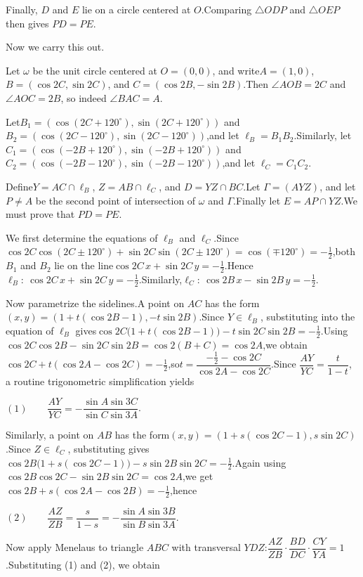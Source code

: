 \begin{enumerate}
 Finally, $D$ and $E$ lie on a circle centered at $O$.Comparing $\triangle ODP$ and $\triangle OEP$ then gives $PD=PE$.

 Now we carry this out.

 Let $\omega$ be the unit circle centered at $O=(0,0)$, and write$A=(1,0)$, $B=(\cos 2C,\sin 2C)$, and $C=(\cos 2B,-\sin 2B)$.Then $\angle AOB=2C$ and $\angle AOC=2B$, so indeed $\angle BAC=A$.

 Let$B_1=(\cos(2C+120^\circ),\sin(2C+120^\circ))$ and$B_2=(\cos(2C-120^\circ),\sin(2C-120^\circ))$,and let $\ell_B=B_1B_2$.Similarly, let$C_1=(\cos(-2B+120^\circ),\sin(-2B+120^\circ))$ and$C_2=(\cos(-2B-120^\circ),\sin(-2B-120^\circ))$,and let $\ell_C=C_1C_2$.

 Define$Y=AC\cap \ell_B$, $Z=AB\cap \ell_C$, and $D=YZ\cap BC$.Let $\Gamma=(AYZ)$, and let $P\ne A$ be the second point of intersection of $\omega$ and $\Gamma$.Finally let $E=AP\cap YZ$.We must prove that $PD=PE$.

 We first determine the equations of $\ell_B$ and $\ell_C$.Since$\cos 2C\cos(2C\pm120^\circ)+\sin 2C\sin(2C\pm120^\circ)=\cos(\mp120^\circ)=-\frac12$,both $B_1$ and $B_2$ lie on the line$\cos 2C\,x+\sin 2C\,y=-\frac12$.Hence$\ell_B:\ \cos 2C\,x+\sin 2C\,y=-\frac12$.Similarly,$\ell_C:\ \cos 2B\,x-\sin 2B\,y=-\frac12$.

 Now parametrize the sidelines.A point on $AC$ has the form$(x,y)=(1+t(\cos 2B-1),-t\sin 2B)$.Since $Y\in \ell_B$, substituting into the equation of $\ell_B$ gives$\cos 2C\bigl(1+t(\cos 2B-1)\bigr)-t\sin 2C\sin 2B=-\frac12$.Using$\cos 2C\cos 2B-\sin 2C\sin 2B=\cos 2(B+C)=\cos 2A$,we obtain$\cos 2C+t(\cos 2A-\cos 2C)=-\frac12$,so$t=\dfrac{-\frac12-\cos 2C}{\cos 2A-\cos 2C}$.Since $\dfrac{AY}{YC}=\dfrac{t}{1-t}$, a routine trigonometric simplification yields

 $(1)\qquad \dfrac{AY}{YC}=-\dfrac{\sin A\sin 3C}{\sin C\sin 3A}$.

 Similarly, a point on $AB$ has the form$(x,y)=(1+s(\cos 2C-1),s\sin 2C)$.Since $Z\in \ell_C$, substituting gives$\cos 2B\bigl(1+s(\cos 2C-1)\bigr)-s\sin 2B\sin 2C=-\frac12$.Again using$\cos 2B\cos 2C-\sin 2B\sin 2C=\cos 2A$,we get$\cos 2B+s(\cos 2A-\cos 2B)=-\frac12$,hence

 $(2)\qquad \dfrac{AZ}{ZB}=\dfrac{s}{1-s}=-\dfrac{\sin A\sin 3B}{\sin B\sin 3A}$.

 Now apply Menelaus to triangle $ABC$ with transversal $YDZ$:$\dfrac{AZ}{ZB}\cdot\dfrac{BD}{DC}\cdot\dfrac{CY}{YA}=1$.Substituting (1) and (2), we obtain


\end{enumerate}
